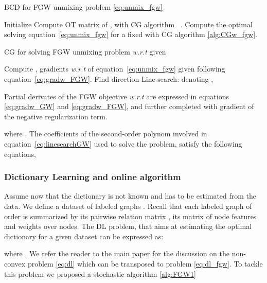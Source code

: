 \documentclass{article}
\def\eqref#1{equation~\ref{#1}}
\begin{document}
	\begin{algorithm}[H]
		\caption{BCD for FGW unmixing problem \ref{eq:unmix_fgw}}
		\label{alg:BCD_fgw}
		\begin{algorithmic}[1]
			\STATE Initialize 
			\REPEAT
			\STATE Compute OT matrix  of , with CG algorithm ~\citep[Alg.1 \& 2]{vayer-fused-2018}.
			\STATE Compute the optimal  solving \eqref{eq:unmix_fgw} for a fixed
			 with CG algorithm \ref{alg:CGw_fgw}.
		\end{algorithmic}
	\end{algorithm}
	\vspace{-4mm}
	\begin{algorithm}[H]
		\caption{CG for solving FGW unmixing problem \emph{w.r.t}  given }
		\label{alg:CGw_fgw}
		\begin{algorithmic}[1]
			\REPEAT
			\STATE Compute , gradients  \emph{w.r.t}  of \eqref{eq:unmix_fgw} given  following \eqref{eq:gradw_FGW}.
			\STATE Find direction  
			\STATE Line-search: denoting ,
			
			\STATE 
		\end{algorithmic}
	\end{algorithm}
	
	Partial derivates of the FGW objective  \emph{w.r.t}  are expressed in equations \ref{eq:gradw_GW} and \ref{eq:gradw_FGW}, and further completed with gradient of the negative regularization term.
	
	where .
	The coefficients of the second-order polynom involved in \eqref{eq:linesearchGW} used to solve the problem, satisfy the following equations,
	
	
	\subsubsection{Dictionary Learning and online algorithm}
	
	Assume now that the dictionary  is not known
	and has to be estimated from the data.
	We define a dataset of  labeled graphs . Recall that each labeled graph  of
	order  is summarized by its pairwise relation matrix , its matrix of node features  and weights  over nodes.
	The DL problem, that aims at estimating the optimal dictionary
	for a given dataset can be expressed as:
	
	where . We refer the reader to the main paper for the discussion on the non-convex problem \ref{eq:dl} which can be transposed to problem \ref{eq:dl_fgw}. To tackle this problem we proposed a stochastic algorithm \ref{alg:FGW1}
	
\end{document}
